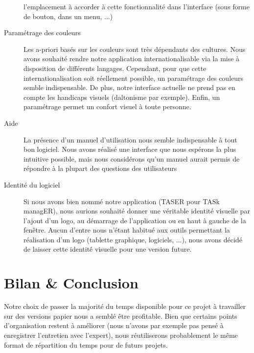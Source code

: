 \documentclass[11pt]{article}
\begin{document}
\begin{description}
  l'emplacement à accorder à cette fonctionnalité dans l'interface
  (sous forme de bouton, dans un menu, ...)
\item[Paramétrage des couleurs] Les a-priori basés sur les couleurs
  sont très dépendants des cultures. Nous avons souhaité rendre notre
  application internationalisable via la mise à disposition de
  différents langages. Cependant, pour que cette internationalisation
  soit réellement possible, un paramétrage des couleurs semble
  indispensable. De plus, notre interface actuelle ne prend pas en
  compte les handicaps visuels (daltonisme par exemple). Enfin, un
  paramétrage permet un confort visuel à toute personne.
\item[Aide] La présence d'un manuel d'utilisation nous semble
  indispensable à tout bon logiciel. Nous avons réalisé une interface
  que nous espérons la plus intuitive possible, mais nous considérons
  qu'un manuel aurait permis de répondre à la plupart des questions
  des utilisateurs
\item[Identité du logiciel] Si nous avons bien nommé notre application
  (TASER pour TASk managER), nous aurions souhaité donner une
  véritable identité visuelle par l'ajout d'un logo, au démarrage de
  l'application ou en haut à gauche de la fenêtre. Aucun d'entre nous
  n'étant habitué aux outils permettant la réalisation d'un logo
  (tablette graphique, logiciels, ...), nous avons décidé de laisser
  cette identité visuelle pour une version future.
\end{description}




\section{Bilan \& Conclusion}

Notre choix de passer la majorité du temps disponible pour ce projet à
travailler sur des versions papier nous a semblé être profitable. Bien
que certains points d'organisation restent à améliorer (nous n'avons
par exemple pas pensé à enregistrer l'entretien avec l'expert), nous
réutiliserons probablement le même format de répartition du temps pour
de futurs projets.
\end{document}
